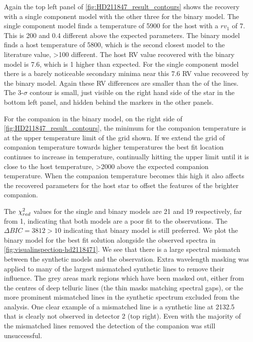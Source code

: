 Again the top left panel of \cref{fig:HD211847_result_contours} shows the recovery with a single component model with the other three for the binary model.
The single component model finds a temperature of 5900\K{} for the host with a \({rv}_1\) of 7\kmps{}.
This is 200\K{} and 0.4\kmps{} different above the expected parameters.
The binary model finds a host temperature of 5800\K{}, which is the second closest model to the literature value, >100\K{} different.
The host {RV} value recovered with the binary model is 7.6\kmps{}, which is 1\kmps{} higher than expected.  For the single component model there is a barely noticeable secondary minima near this 7.6\kmps{} {RV} value recovered by the binary model.
Again these {RV} differences are smaller than the {\fwhm} of the lines.
The 3-\(\sigma\) contour is small, just visible on the right hand side of the star in the bottom left panel, and hidden behind the markers in the other panels.


For the companion in the binary model, on the right side of \cref{fig:HD211847_result_contours}, the minimum \textchisquared{} for the companion temperature is at the upper temperature limit of the grid shown.
If we extend the grid of companion temperature towards higher temperatures the best fit location continues to increase in temperature, continually hitting the upper limit until it is close to the host temperature, >2000\K{} above the expected companion temperature.
When the companion temperature becomes this high it also affects the recovered parameters for the host star to offset the features of the brighter companion.

The \({\chi}^{2}_{red}\) values for the single and binary models are 21 and 19 respectively, far from 1, indicating that both models are a poor fit to the observations. {\red{} The $\Delta {BIC} = 3812 >10$ indicating that binary model is still preferred.} We plot the binary model for the best fit solution alongside the observed spectra in \cref{fig:visualinspection-hd2118471}.
We see that there is a large spectral mismatch between the synthetic models and the observation.
Extra wavelength masking was applied to many of the largest mismatched synthetic lines to remove their influence.
The grey areas mark regions which have been masked out, either from the centres of deep telluric lines (the thin masks matching spectral gaps), or the more prominent mismatched lines in the synthetic spectrum excluded from the \textchisquared{} analysis.
One clear example of a mismatched line is a synthetic line at 2132.5\nm{} that is clearly not observed in detector 2 (top right).
Even with the majority of the mismatched lines removed the detection of the companion was still unsuccessful.

